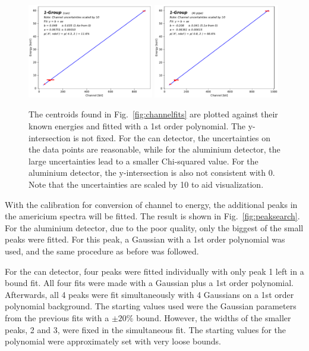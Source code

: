 \begin{figure}[htbp]
  \includegraphics[width=0.49\textwidth,page=1]{graphics/energychannelcalib.pdf}
  \includegraphics[width=0.49\textwidth,page=1]{graphics/aluenergychannelcalib.pdf}
  \caption{The centroids found in Fig.~\ref{fig:channelfits} are plotted against their known energies and fitted with a 1st order polynomial. The y-intersection is not fixed. For the can detector, the uncertainties on the data points are reasonable, while for the aluminium detector, the large uncertainties lead to a smaller Chi-squared value. For the aluminium detector, the y-intersection is also not consistent with 0. Note that the uncertainties are scaled by 10 to aid visualization.}
  \label{fig:energychannelcalib}
\end{figure}

With the calibration for conversion of channel to energy, the additional peaks in the americium spectra will be fitted. The result is shown in Fig.~\ref{fig:peaksearch}. For the aluminium detector, due to the poor quality, only the biggest of the small peaks were fitted. For this peak, a Gaussian with a 1st order polynomial was used, and the same procedure as before was followed.

For the can detector, four peaks were fitted individually with only peak 1 left in a bound fit. All four fits were made with a Gaussian plus a 1st order polynomial. Afterwards, all 4 peaks were fit simultaneously with 4 Gaussians on a 1st order polynomial background. The starting values used were the Gaussian parameters from the previous fits with a $\pm 20\%$ bound. However, the widths of the smaller peaks, 2 and 3, were fixed in the simultaneous fit. The starting values for the polynomial were approximately set with very loose bounds.

